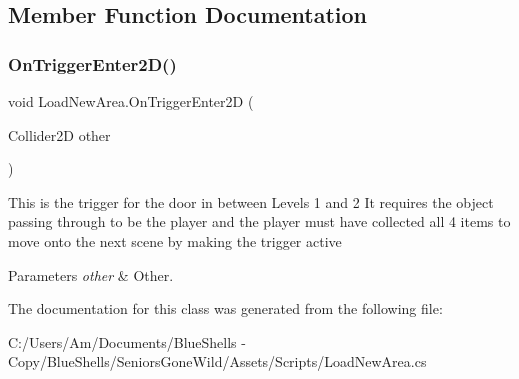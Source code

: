 \subsection{Member Function Documentation}
\mbox{\label{class_load_new_area_abdcf65c2a5ab9925bbd336e774baa82e}} 
\subsubsection{\texorpdfstring{On\+Trigger\+Enter2\+D()}{OnTriggerEnter2D()}}
{\footnotesize\ttfamily void Load\+New\+Area.\+On\+Trigger\+Enter2D (\begin{DoxyParamCaption}\item[{Collider2D}]{other }\end{DoxyParamCaption})\hspace{0.3cm}{\ttfamily [private]}}



This is the trigger for the door in between Levels 1 and 2 It requires the object passing through to be the player and the player must have collected all 4 items to move onto the next scene by making the trigger active 


\begin{DoxyParams}{Parameters}
{\em other} & Other.\\
\hline
\end{DoxyParams}


The documentation for this class was generated from the following file\+:\begin{DoxyCompactItemize}
\item 
C\+:/\+Users/\+Am/\+Documents/\+Blue\+Shells -\/ Copy/\+Blue\+Shells/\+Seniors\+Gone\+Wild/\+Assets/\+Scripts/Load\+New\+Area.\+cs\end{DoxyCompactItemize}
